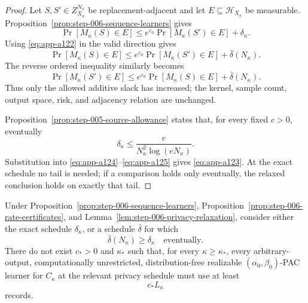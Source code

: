 \begin{proof}
Let \(S,S'\in Z_{X_\kappa}^{N_\kappa}\) be replacement-adjacent and
let \(E\subseteq\mathcal H_{X_\kappa}\) be measurable.
Proposition~\ref{prop:step-006-sequence-learners} gives
\[
\Pr[M_\kappa(S)\in E]
\leq e^{\varepsilon_0}\Pr[M_\kappa(S')\in E]
+\delta_\kappa.
\]
Using \eqref{eq:app-a122} in the valid direction gives
\begin{equation}
\Pr[M_\kappa(S)\in E]
\leq e^{\varepsilon_0}\Pr[M_\kappa(S')\in E]
+\bar\delta(N_\kappa).
\label{eq:app-a124}
\end{equation}
The reverse ordered inequality similarly becomes
\begin{equation}
\Pr[M_\kappa(S')\in E]
\leq e^{\varepsilon_0}\Pr[M_\kappa(S)\in E]
+\bar\delta(N_\kappa).
\label{eq:app-a125}
\end{equation}
Thus only the allowed additive slack has increased; the kernel,
sample count, output space, risk, and adjacency relation are
unchanged.

Proposition~\ref{prop:step-005-source-allowance} states that, for every
fixed \(c>0\), eventually
\[
\delta_\kappa
\leq\frac{c}{N_\kappa^2\log(eN_\kappa)}.
\]
Substitution into \eqref{eq:app-a124}--\eqref{eq:app-a125} gives \eqref{eq:app-a123}.  At the exact
schedule no tail is needed; if a comparison holds only eventually,
the relaxed conclusion holds on exactly that tail.
\end{proof}

\begin{proposition}
\label{prop:step-006-omega-contradiction}
Under Proposition~\ref{prop:step-006-sequence-learners},
Proposition~\ref{prop:step-006-rate-certificates}, and
Lemma~\ref{lem:step-006-privacy-relaxation}, consider either the exact
schedule \(\delta_\kappa\), or a schedule \(\bar\delta\) for which
\begin{equation}
\bar\delta(N_\kappa)\geq\delta_\kappa
\quad\text{eventually}.
\label{eq:app-a126}
\end{equation}
There do not exist \(c_*>0\) and \(\kappa_*\) such that, for every
\(\kappa\geq\kappa_*\), every arbitrary-output, computationally
unrestricted, distribution-free realizable
\((\alpha_0,\beta_0)\)-PAC learner for \(C_\kappa\) at the relevant
privacy schedule must use at least
\begin{equation}
c_*L_\kappa
\label{eq:app-a127}
\end{equation}
records.
\end{proposition}

